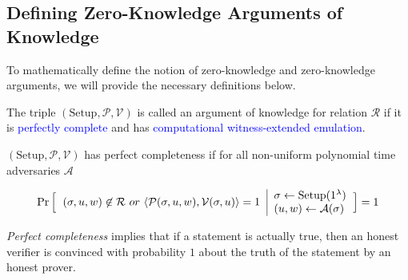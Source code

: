 \subsection{Defining Zero-Knowledge Arguments of Knowledge}
\label{subsec:zka/d_aok}
To mathematically define the notion of zero-knowledge and zero-knowledge arguments, we will provide the necessary definitions below.

\begin{defn}
        The triple $(\text{Setup}, \mathcal{P}, \mathcal{V})$ is called an argument of knowledge for relation $\mathcal{R}$ if it is \textcolor{blue}{perfectly complete} and has \textcolor{blue}{computational witness-extended emulation}.
\end{defn}

\begin{defn}
    $(\text{Setup}, \mathcal{P}, \mathcal{V})$ has perfect completeness if for all non-uniform polynomial time adversaries $\mathcal{A}$

    \begin{equation*}
    \Pr 
    \Big[
    \begin{tabular}{c | l}
         \multirow{2}{*}{$(\sigma, u, w) \not \in \mathcal{R} \ or \ 
         \langle \mathcal{P}(\sigma, u, w), \mathcal{V}(\sigma, u) \rangle = 1$}
         & $\sigma \leftarrow \text{Setup}(1^{\lambda})$
         \\
         & 
         $(u, w) \leftarrow \mathcal{A}(\sigma)$
    \end{tabular}
    \Big] 
    = 1
\end{equation*}
\end{defn}

\emph{Perfect completeness} implies that if a statement is actually true, then an honest verifier is convinced with probability $1$ about the truth of the statement by an honest prover.

